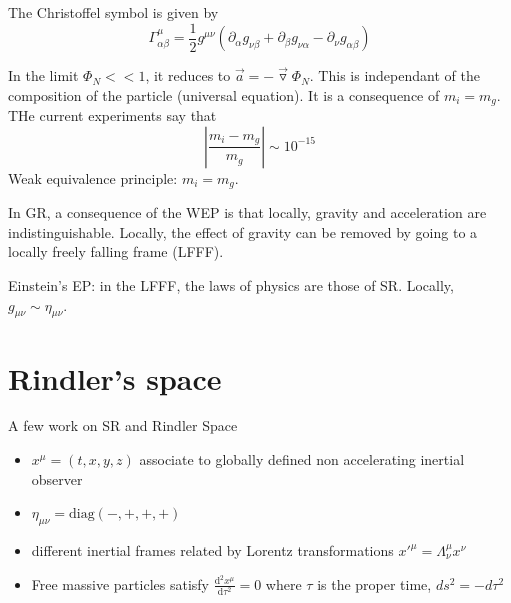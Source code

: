 \documentclass[a4paper]{book}
\theoremstyle{definition}
\theoremstyle{remark}
\begin{document}
The Christoffel symbol is given by 
\begin{equation}
    \Gamma^\mu_{\alpha\beta} = \frac{1}{2}g^{\mu\nu} (\partial_\alpha g_{\nu\beta} + \partial_\beta g_{\nu\alpha} - \partial_\nu g_{\alpha\beta})
\end{equation}\par \medskip 

In the limit $\Phi_N << 1$, it reduces to $\vec{a} = - \vec{\triangledown} \Phi_N$. This is independant of the composition of the particle (universal equation). It is a consequence of $m_i = m_g$. THe current experiments say that 
\begin{equation*}
    \left|\frac{m_i - m_g}{m_g}\right| \sim 10^{-15}
\end{equation*}
Weak equivalence principle: $m_i = m_g$. \par \medskip 

In GR, a consequence of the WEP is that locally, gravity and acceleration are indistinguishable. Locally, the effect of gravity can be removed by going to a locally freely falling frame (LFFF).\par 
Einstein's EP: in the LFFF, the laws of physics are those of SR. Locally, $g_{\mu\nu} \sim \eta_{\mu\nu}$. 

\section{Rindler's space}

A few work on SR and Rindler Space
\begin{itemize}
    \item $x^\mu = (t, x, y, z)$ associate to globally defined non accelerating inertial observer 
    \item $\eta_{\mu\nu} = \text{diag}(-, +, +, +)$
    \item different inertial frames related by Lorentz transformations $x'^\mu = \Lambda ^\mu_\nu x^\nu$
    \item Free massive particles satisfy $\frac{\text{d}^2x^\mu}{\text{d}\tau^2} = 0$ where $\tau$ is the proper time, $ds^2 = -d\tau^2$
\end{itemize}
\end{document}
